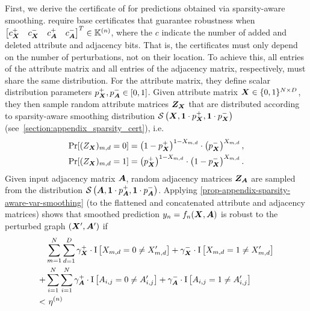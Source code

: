 First, we derive the certificate of \citet{Schuchardt2021} for predictions obtained via sparsity-aware smoothing.
\citet{Schuchardt2021} require base certificates that guarantee robustness when $\begin{bmatrix} c_{\bm{X}}^{+} &  c_{\bm{X}}^{-} & c_{\bm{A}}^{+} &  c_{\bm{A}}^{-}\end{bmatrix}^T \in {\mathbb{K}}^{(n)}$, where the $c$ indicate the number of added and deleted attribute and adjacency bits.
That is, the certificates must only depend on the number of perturbations, not on their location.
To achieve this, all entries of the attribute matrix and all entries of the adjacency matrix, respectively, must share the same distribution.
For the attribute matrix, they define scalar distribution parameters $p_{\bm{X}}^{+}, p_{\bm{A}}^{-} \in [0,1]$.
Given  attribute matrix ${\bm{X}} \in \{0,1\}^{N \times D}$, they then sample random attribute matrices ${\bm{Z}}_{\bm{X}}$ that
are distributed according to sparsity-aware smoothing distribution $\mathcal{S}\left({\bm{X}}, \bm{1} \cdot p_{\bm{X}}^{+}  , \bm{1} \cdot p_{\bm{X}}^{-} \right)$
(see~\autoref{section:appendix_sparsity_cert}), i.e.~ 
\begin{gather*}
    \Pr[({Z}_{\bm{X}})_{m,d} =0 ] = \left(1 - p_{\bm{X}}^{+} \right)^{1 - {X}_{m,d}} \cdot \left( p_{\bm{X}}^{-} \right)^{{X}_{m,d}}, \\
    \Pr[({Z}_{\bm{X}})_{m,d} =1 ] = \left(p_{\bm{X}}^{+} \right)^{1 -{X}_{m,d}} \cdot \left( 1 - p_{\bm{X}}^{-} \right)^{{X}_{m,d}}.
\end{gather*}
Given input adjacency matrix ${\bm{A}}$, random adjacency matrices ${\bm{Z}}_{\bm{A}}$ are sampled from the distribution
$\mathcal{S}\left({\bm{A}}, \bm{1} \cdot p_{\bm{A}}^{+}  , \bm{1} \cdot p_{\bm{A}}^{-} \right)$.
Applying \cref{prop-appendix-sparsity-aware-var-smoothing} (to the flattened and concatenated attribute and adjacency matrices) shows that smoothed prediction ${y}_n = f_n({\bm{X}}, {\bm{A}})$ is robust to the perturbed graph $\left({\bm{X}}', {\bm{A}}'\right)$ if
\begin{equation}\label{eq:sparse_iid_cert_1}
\begin{split}
        &\sum_{m=1}^{N}\sum_{d=1}^{D}
            \gamma_\mX^{+} \cdot \mathrm{I}\left[\emX_{m,d} = 0 \neq \emX'_{m,d}\right]  + 
            \gamma_\mX^{-} \cdot \mathrm{I}\left[\emX_{m,d} = 1 \neq \emX'_{m,d}\right]
            \\
            +
            &
            \sum_{i=1}^{N}\sum_{i=1}^{N}
            \gamma_\mA^{+} \cdot \mathrm{I}\left[\emA_{i,j} = 0 \neq \emA'_{i,j}\right]  + 
            \gamma_\mA^{-} \cdot \mathrm{I}\left[\emA_{i,j} = 1 \neq \emA'_{i,j}\right]
                        \\
           <
           & \ 
            \eta^{(n)}
\end{split}
\end{equation}
